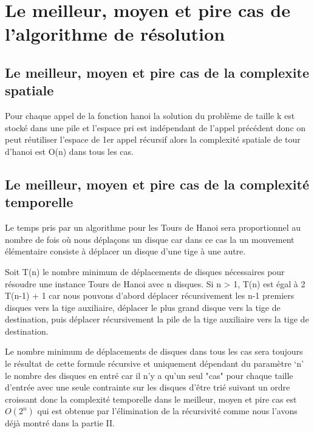 \section{Le meilleur, moyen et pire cas de l'algorithme de résolution}
\subsection{Le meilleur, moyen et pire cas de la complexite spatiale}
\par Pour chaque appel de la fonction hanoi la solution du problème de taille k est stocké dans une pile et l’espace pri est indépendant de l’appel précédent donc on peut réutiliser l’espace  de 1er appel récursif alors la complexité spatiale de tour d’hanoi est O(n) dans tous les cas.

\subsection{Le meilleur, moyen et pire cas de la complexité temporelle}
\par Le temps pris par un algorithme pour les Tours de Hanoi sera proportionnel au nombre de fois où nous déplaçons un disque car dans ce cas la un mouvement élémentaire consiste à déplacer un disque d'une tige à une autre. 
\par Soit T(n) le nombre minimum de déplacements de disques nécessaires pour résoudre une instance Tours de Hanoi avec n disques. Si n > 1, T(n) est égal à 2 T(n-1) + 1 car nous pouvons d'abord déplacer récursivement les n-1 premiers disques vers la tige auxiliaire, déplacer le plus grand disque vers la tige de destination, puis déplacer récursivement la pile de la tige auxiliaire vers la tige de destination.
\par Le nombre minimum de déplacements de disques dans tous les cas sera toujours le résultat de cette formule récursive et uniquement dépendant du paramètre ‘n’ le nombre des disques  en entré car il n'y a qu'un seul "cas" pour chaque taille d'entrée avec une seule contrainte sur les disques d'être trié suivant un ordre croissant donc  la complexité temporelle dans le meilleur, moyen et pire cas est $O(2^n)$ qui est obtenue par l'élimination de la récursivité comme nous l’avons déjà montré dans la partie II.\\


